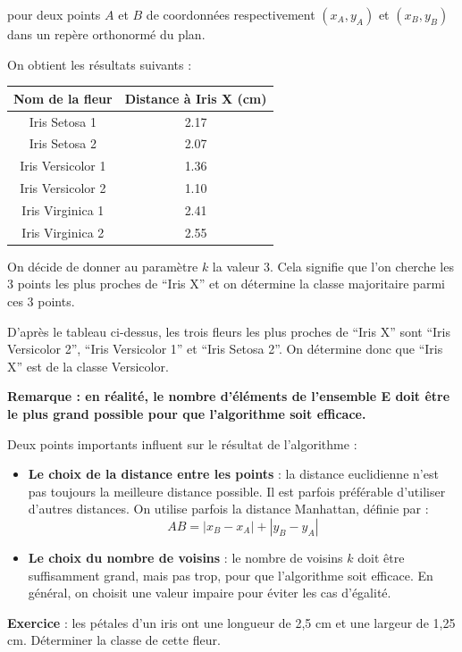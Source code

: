 \documentclass[
  a4paper,
  DIV=11,
  numbers=noendperiod]{scrartcl}
\newcounter{none} %
\providecommand{\tightlist}{%
  \setlength{\itemsep}{0pt}\setlength{\parskip}{0pt}}
\begin{document}
pour deux points \(A\) et \(B\) de coordonnées respectivement
\((x_A, y_A)\) et \((x_B, y_B)\) dans un repère orthonormé du plan.

On obtient les résultats suivants :

{\def\LTcaptype{none} %
\begin{longtable}[]{@{}cc@{}}
\toprule\noalign{}
Nom de la fleur & Distance à Iris X (cm) \\
\midrule\noalign{}
\endhead
\bottomrule\noalign{}
\endlastfoot
Iris Setosa 1 & 2.17 \\
Iris Setosa 2 & 2.07 \\
Iris Versicolor 1 & 1.36 \\
Iris Versicolor 2 & 1.10 \\
Iris Virginica 1 & 2.41 \\
Iris Virginica 2 & 2.55 \\
\end{longtable}
}

On décide de donner au paramètre \(k\) la valeur 3. Cela signifie que
l'on cherche les 3 points les plus proches de ``Iris X'' et on détermine
la classe majoritaire parmi ces 3 points.

D'après le tableau ci-dessus, les trois fleurs les plus proches de
``Iris X'' sont ``Iris Versicolor 2'', ``Iris Versicolor 1'' et ``Iris
Setosa 2''. On détermine donc que ``Iris X'' est de la classe
Versicolor.

\textbf{Remarque : en réalité, le nombre d'éléments de l'ensemble E doit
être le plus grand possible pour que l'algorithme soit efficace.}

\begin{tcolorbox}[enhanced jigsaw, arc=.35mm, bottomrule=.15mm, bottomtitle=1mm, breakable, colback=white, colbacktitle=quarto-callout-important-color!10!white, colframe=quarto-callout-important-color-frame, coltitle=black, left=2mm, leftrule=.75mm, opacityback=0, opacitybacktitle=0.6, rightrule=.15mm, title=\textcolor{quarto-callout-important-color}{\faExclamation}\hspace{0.5em}{Important}, titlerule=0mm, toprule=.15mm, toptitle=1mm]

Deux points importants influent sur le résultat de l'algorithme :

\begin{itemize}
\tightlist
\item
  \textbf{Le choix de la distance entre les points} : la distance
  euclidienne n'est pas toujours la meilleure distance possible. Il est
  parfois préférable d'utiliser d'autres distances. On utilise parfois
  la distance Manhattan, définie par : \[AB=|x_B-x_A|+|y_B-y_A|\]
\item
  \textbf{Le choix du nombre de voisins} : le nombre de voisins \(k\)
  doit être suffisamment grand, mais pas trop, pour que l'algorithme
  soit efficace. En général, on choisit une valeur impaire pour éviter
  les cas d'égalité.
\end{itemize}

\end{tcolorbox}

\textbf{Exercice} : les pétales d'un iris ont une longueur de 2,5 cm et
une largeur de 1,25 cm. Déterminer la classe de cette fleur.
\end{document}
